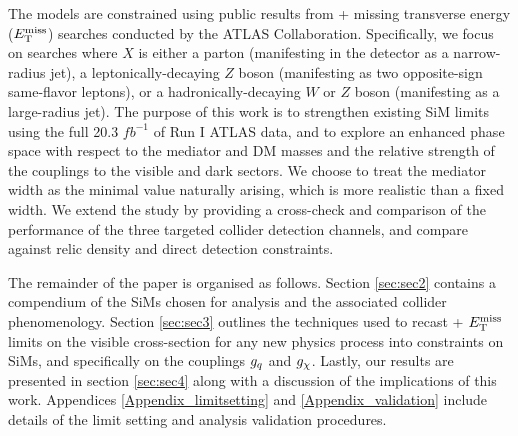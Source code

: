 The models are constrained using public results from \monoX + missing transverse energy ($E_{\mathrm{T}}^{\mathrm{miss}}$) searches conducted by the ATLAS Collaboration. Specifically, we focus on searches where $X$ is either a parton (manifesting in the detector as a narrow-radius jet), a leptonically-decaying $Z$ boson (manifesting as two opposite-sign same-flavor leptons), or a hadronically-decaying $W$ or $Z$ boson (manifesting as a large-radius jet). The purpose of this work is to strengthen existing SiM limits using the full 20.3 $fb^{-1}$ of Run I ATLAS data, and to explore an enhanced phase space with respect to the mediator and DM masses and the relative strength of the couplings to the visible and dark sectors.
We choose to treat the mediator width as the minimal value naturally arising, which is more realistic than a fixed width. We extend the study by providing a cross-check and comparison of the performance of the three targeted collider detection channels, and compare against relic density and direct detection constraints.

The remainder of the paper is organised as follows. Section \ref{sec:sec2} contains a compendium of the SiMs chosen for analysis and the associated collider phenomenology. Section \ref{sec:sec3} outlines the techniques used to recast \monoX + $E_{\mathrm{T}}^{\mathrm{miss}}$ limits on the visible cross-section for any new physics process into constraints on SiMs, and specifically on the couplings $g_q$ and $g_{\chi}$. Lastly, our results are presented in section \ref{sec:sec4} along with a discussion of the implications of this work. Appendices \ref{Appendix_limitsetting} and \ref{Appendix_validation} include  details of the limit setting and analysis validation procedures.
